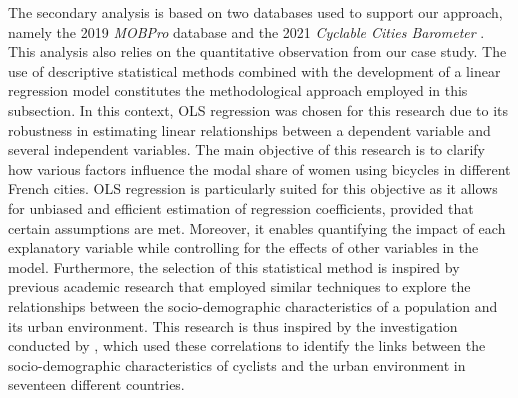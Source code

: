 \begin{refsegment}
The secondary analysis is based on two databases used to support our approach, namely the 2019 \textsl{MOBPro} database \textcolor{blue}{\autocite{insee_documentation_2023}} and the 2021 \textsl{Cyclable Cities Barometer} \textcolor{blue}{\autocite{fub_barometre_2021}}. This analysis also relies on the quantitative observation from our case study. The use of descriptive statistical methods combined with the development of a linear regression model constitutes the methodological approach employed in this subsection. In this context, \acrshort{OLS} regression was chosen for this research due to its robustness in estimating linear relationships between a dependent variable and several independent variables. The main objective of this research is to clarify how various factors influence the modal share of women using bicycles in different French cities. \acrshort{OLS} regression is particularly suited for this objective as it allows for unbiased and efficient estimation of regression coefficients, provided that certain assumptions are met. Moreover, it enables quantifying the impact of each explanatory variable while controlling for the effects of other variables in the model. Furthermore, the selection of this statistical method is inspired by previous academic research that employed similar techniques to explore the relationships between the socio-demographic characteristics of a population and its urban environment. This research is thus inspired by the investigation conducted by \textcolor{blue}{\textcite[64]{goel_cycling_2022}}, which used these correlations to identify the links between the socio-demographic characteristics of cyclists and the urban environment in seventeen different countries. %


\end{refsegment}
